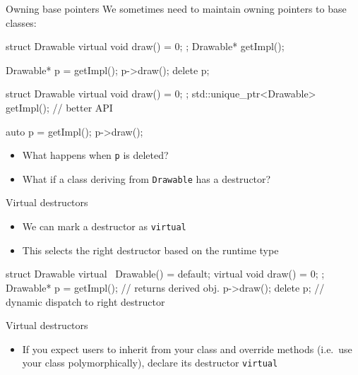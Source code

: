 \begin{frame}[fragile]
  \begin{block}{Owning base pointers}
    We sometimes need to maintain owning pointers to base classes:
  \end{block}
  \begin{overprint}
  \begin{cppcode}
    struct Drawable {
       virtual void draw() = 0;
    };
    Drawable* getImpl();

    Drawable* p = getImpl();
    p->draw();
    delete p;
  \end{cppcode}
  \begin{cppcode}
    struct Drawable {
       virtual void draw() = 0;
    };
    std::unique_ptr<Drawable> getImpl(); // better API

    auto p = getImpl();
    p->draw();
  \end{cppcode}
  \end{overprint}
  \begin{block}{}
    \begin{itemize}
      \item What happens when \texttt{p} is deleted?
      \item What if a class deriving from \texttt{Drawable} has a destructor?
    \end{itemize}
  \end{block}
\end{frame}

\begin{frame}[fragile]
  \begin{block}{Virtual destructors}
    \begin{itemize}
    \item We can mark a destructor as \texttt{virtual}
    \item This selects the right destructor based on the runtime type
    \end{itemize}
  \end{block}
  \begin{cppcode}
    struct Drawable {
       virtual ~Drawable() = default;
       virtual void draw() = 0;
    };
    Drawable* p = getImpl(); // returns derived obj.
    p->draw();
    delete p; // dynamic dispatch to right destructor
  \end{cppcode}
  \begin{goodpractice}{Virtual destructors}
    \begin{itemize}
      \item If you expect users to inherit from your class and override methods (i.e.\ use your class polymorphically), declare its destructor \texttt{virtual}
    \end{itemize}
  \end{goodpractice}
\end{frame}

